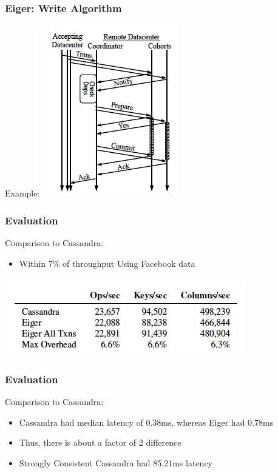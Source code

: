 \documentclass{beamer}
\begin{document}
\begin{frame}
\frametitle{Eiger: Write Algorithm}
Example:
\includegraphics[scale=0.5]{Figure_Write_Transaction.png}
\end{frame}

\begin{frame}
\frametitle{Evaluation}
Comparison to Cassandra:
\begin{itemize}
	\item Within 7\% of throughput Using Facebook data
\end{itemize}
\includegraphics[scale=0.6]{Figure_Facebook_Throughput.png}  
\end{frame}

\begin{frame}
\frametitle{Evaluation}
Comparison to Cassandra:
\begin{itemize}
	\item Cassandra had median latency of 0.38ms, whereas Eiger had 0.78ms
	\item Thus, there is about a factor of 2 difference
	\item Strongly Consistent Cassandra had 85.21ms latency
\end{itemize}
\end{frame}
\end{document}

